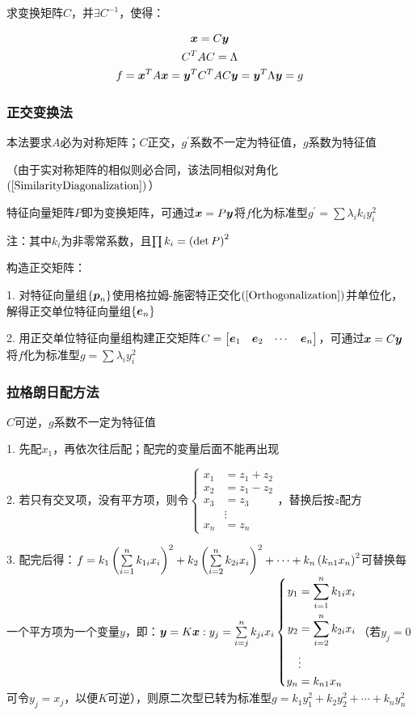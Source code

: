 \documentclass{article}
\begin{document}
求变换矩阵$C$，并$\exists C^{-1}$，使得：

\[\begin{gathered}
        \boldsymbol x=C\boldsymbol y\\
        C^TAC=\Lambda\\
        f=\boldsymbol x^TA\boldsymbol x=\boldsymbol y^TC^TAC\boldsymbol y=\boldsymbol y^T\Lambda\boldsymbol y=g
    \end{gathered}\]

\subsubsection{正交变换法}

本法要求$A$必为对称矩阵；$C$正交，$g^\prime$系数不一定为特征值，$g$系数为特征值

（由于实对称矩阵的相似则必合同，该法同相似对角化$\left(\ref{SimilarityDiagonalization}\right)$）

特征向量矩阵$P$即为变换矩阵，可通过$\boldsymbol x=P\boldsymbol y$将$f$化为标准型$g^\prime=\sum\lambda_ik_iy_i^2$

注：其中$k_i$为非零常系数，且$\prod k_i=\left(\det P\right)^2$

构造正交矩阵：

1. 对特征向量组$\left\{\boldsymbol p_n\right\}$使用格拉姆-施密特正交化$\left(\ref{Orthogonalization}\right)$并单位化，解得正交单位特征向量组$\left\{\boldsymbol e_n\right\}$

2. 用正交单位特征向量组构建正交矩阵$C=\begin{bmatrix}\boldsymbol e_1&\boldsymbol e_2&\cdots&\boldsymbol e_n\end{bmatrix}$，可通过$\boldsymbol x=C\boldsymbol y$将$f$化为标准型$g=\sum\lambda_iy_i^2$

\subsubsection{拉格朗日配方法}

$C$可逆，$g$系数不一定为特征值

1. 先配$x_1$，再依次往后配；配完的变量后面不能再出现

2. 若只有交叉项，没有平方项，则令$\left\{\begin{aligned}
        x_1 & =z_1+z_2 \\
        x_2 & =z_1-z_2 \\
        x_3 & =z_3     \\
            & \vdots   \\
        x_n & =z_n
    \end{aligned}\right.$，替换后按$z$配方

3. 配完后得：$f=k_1\left(\sum\limits_{i=1}^nk_{1i}x_i\right)^2+
    k_2\left(\sum\limits_{i=2}^nk_{2i}x_i\right)^2+\cdots+
    k_n\left(k_{n1}x_n\right)^2$可替换每一个平方项为一个变量$y$，即：$\boldsymbol y=K\boldsymbol x:y_j=\sum\limits_{i=j}^nk_{ji}x_i\left\{\begin{aligned}
        y_1 & =\sum_{i=1}^nk_{1i}x_i \\
        y_2 & =\sum_{i=2}^nk_{2i}x_i \\
            & \vdots                 \\
        y_n & =k_{n1}x_n
    \end{aligned}\right.$（若$y_j=0$可令$y_j=x_j$，以便$K$可逆），则原二次型已转为标准型$g=k_1y_1^2+k_2y_2^2+\cdots+k_ny_n^2$
\end{document}
